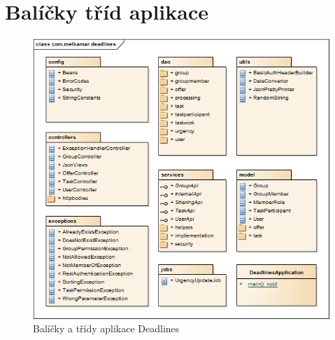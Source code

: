 \documentclass[thesis=B,czech]{FITthesis}[2012/06/26]
\begin{document}
\section{Balíčky tříd aplikace}
\begin{figure}\centering
	\includegraphics[width=1\textwidth]{ea-diagrams/packages/root.png}
	\caption[Balíčky tříd]{Balíčky a třídy aplikace Deadlines}
	\label{diagram:packages-root}
\end{figure}
\end{document}
